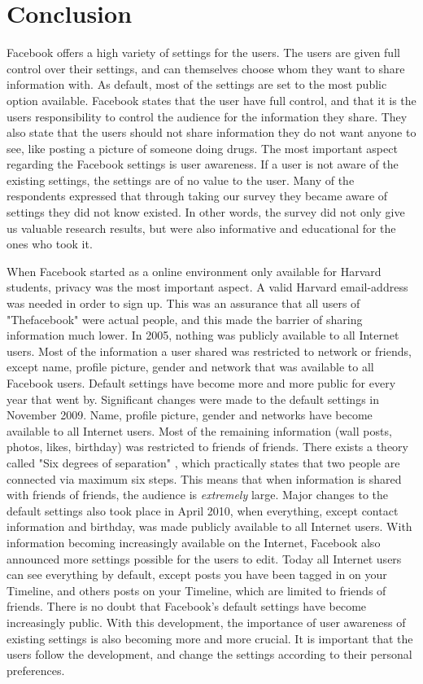 \chapter{Conclusion}
\label{chp:conclusion} 

Facebook offers a high variety of settings for the users. The users are given full control over their settings, and can themselves choose whom they want to share information with. As default, most of the settings are set to the most public option available. Facebook states that the user have full control, and that it is the users responsibility to control the audience for the information they share. They also state that the users should not share information they do not want anyone to see, like posting a picture of someone doing drugs. The most important aspect regarding the Facebook settings is user awareness. If a user is not aware of the existing settings, the settings are of no value to the user. Many of the respondents expressed that through taking our survey they became aware of settings they did not know existed. In other words, the survey did not only give us valuable research results, but were also informative and educational for the ones who took it.  

When Facebook started as a online environment only available for Harvard students, privacy was the most important aspect. A valid Harvard email-address was needed in order to sign up. This was an assurance that all users of "Thefacebook" were actual people, and this made the barrier of sharing information much lower. In 2005, nothing was publicly available to all Internet users. Most of the information a user shared was restricted to network or friends, except name, profile picture, gender and network that was available to all Facebook users. Default settings have become more and more public for every year that went by. Significant changes were made to the default settings in November 2009. Name, profile picture, gender and networks have become available to all Internet users. Most of the remaining information (wall posts, photos, likes, birthday) was restricted to friends of friends. There exists a theory called "Six degrees of separation" \cite{six}, which practically states that two people are connected via maximum six steps. This means that when information is shared with friends of friends, the audience is \textit{extremely} large. Major changes to the default settings also took place in April 2010, when everything, except contact information and birthday, was made publicly available to all Internet users. With information becoming increasingly available on the Internet, Facebook also announced more settings possible for the users to edit. Today all Internet users can see everything by default, except posts you have been tagged in on your Timeline, and others posts on your Timeline, which are limited to friends of friends. There is no doubt that Facebook's default settings have become increasingly public. With this development, the importance of user awareness of existing settings is also becoming more and more crucial. It is important that the users follow the development, and change the settings according to their personal preferences. 


